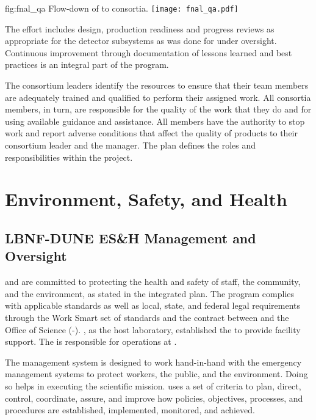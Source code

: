 \begin{dunefigure}[\fnal QA]{fig:fnal_qa}
  {Flow-down of \fnal {} to consortia.}
  \texttt{[image: fnal\_qa.pdf]}
\end{dunefigure}

The  effort includes design, production readiness and
progress reviews as appropriate for the  detector
subsystems as was done for  under 
oversight. Continuous improvement through documentation of lessons learned and best practices is
an integral part of the program. 


The  consortium leaders identify the
resources to ensure that their team members are adequately trained and
qualified to perform their assigned work. 
All consortia members, in turn, are responsible for the quality of the work that
they do and for using available guidance and assistance. All members 
have the authority to stop work and report adverse conditions that
affect the quality of  products to their 
 consortium leader and the 
 manager. The  plan
defines the  roles and responsibilities within the 
project.


\section{Environment, Safety, and Health}
\label{sec:es-tc-eshq}

\subsection{LBNF-DUNE ES\&H Management and Oversight}
\label{sec:es-tc-eshq-prog}

 and  are committed to protecting the health and
safety of staff, the community, and the environment, as stated in the
 integrated  plan.  The
 program complies with applicable standards as well as local,
state, and federal legal requirements through the  Work Smart set
of standards and the contract between  and the
 Office of Science (-). , as the host
laboratory, established the  to provide
facility support.  The  is responsible
for  operations at .

The   management system is
designed to work hand-in-hand with the  emergency
management systems to protect workers, the public, and the environment.
 Doing so helps in executing the
scientific mission.   uses a set of criteria to plan, direct,
control, coordinate, assure, and improve how  policies,
objectives, processes, and procedures are established, implemented,
monitored, and achieved. 



